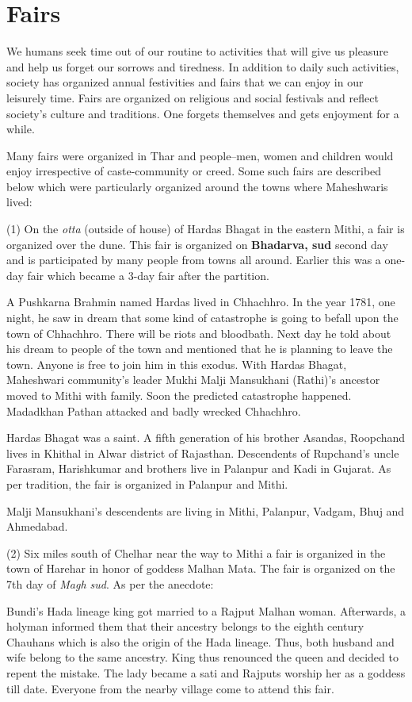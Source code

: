 \chapter{Fairs}
We humans seek time out of our routine to activities that will give us pleasure
and help us forget our sorrows and tiredness. In addition to daily such
activities, society has organized annual festivities and fairs that we can
enjoy in our leisurely time. Fairs are organized on religious and social
festivals and reflect society's culture and traditions. One forgets themselves
and gets enjoyment for a while.

Many fairs were organized in Thar and people--men, women and children would
enjoy irrespective of caste-community or creed. Some such fairs are described
below which were particularly organized around the towns where Maheshwaris
lived:

(1) On the \textit{otta} (outside of house) of Hardas Bhagat in the eastern
Mithi, a fair is organized over the dune. This fair is organized on
\textbf{Bhadarva, sud} second day and is participated by many people from towns
all around. Earlier this was a one-day fair which became a 3-day fair after the
partition.

A Pushkarna Brahmin named Hardas lived in Chhachhro. In the year 1781, one
night, he saw in dream that some kind of catastrophe is going to befall upon
the town of Chhachhro. There will be riots and bloodbath. Next day he told
about his dream to people of the town and mentioned that he is planning to
leave the town. Anyone is free to join him in this exodus. With Hardas Bhagat,
Maheshwari community's leader Mukhi Malji Mansukhani (Rathi)'s ancestor moved
to Mithi with family. Soon the predicted catastrophe happened. Madadkhan Pathan
attacked and badly wrecked Chhachhro.

Hardas Bhagat was a saint. A fifth generation of his brother Asandas, Roopchand
lives in Khithal in Alwar district of Rajasthan. Descendents of Rupchand's
uncle Farasram, Harishkumar and brothers live in Palanpur and Kadi in Gujarat.
As per tradition, the fair is organized in Palanpur and Mithi.

Malji Mansukhani's descendents are living in Mithi, Palanpur, Vadgam, Bhuj and
Ahmedabad.

(2) Six miles south of Chelhar near the way to Mithi a fair is organized in the
town of Harehar in honor of goddess Malhan Mata. The fair is organized on the
7th day of \textit{Magh sud}. As per the anecdote:

Bundi's Hada lineage king got married to a Rajput Malhan woman. Afterwards, a
holyman informed them that their ancestry belongs to the eighth century
Chauhans which is also the origin of the Hada lineage. Thus, both husband and
wife belong to the same ancestry. King thus renounced the queen and decided to
repent the mistake. The lady became a sati and Rajputs worship her as a goddess
till date. Everyone from the nearby village come to attend this fair.

